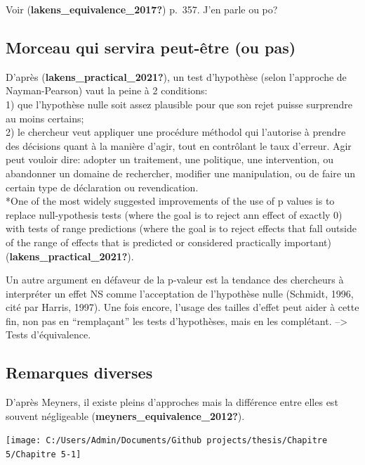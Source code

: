 \documentclass[
  english,
  man]{apa6}
\begin{document}
Voir (\textbf{lakens\_equivalence\_2017?}) p.~357. J'en parle ou po?

\hypertarget{morceau-qui-servira-peut-uxeatre-ou-pas}{%
\subsection{Morceau qui servira peut-être (ou pas)}\label{morceau-qui-servira-peut-uxeatre-ou-pas}}

D'après (\textbf{lakens\_practical\_2021?}), un test d'hypothèse (selon l'approche de Nayman-Pearson) vaut la peine à 2 conditions:\\
1) que l'hypothèse nulle soit assez plausible pour que son rejet puisse surprendre au moins certains;\\
2) le chercheur veut appliquer une procédure méthodol qui l'autorise à prendre des décisions quant à la manière d'agir, tout en contrôlant le taux d'erreur. Agir peut vouloir dire: adopter un traitement, une politique, une intervention, ou abandonner un domaine de rechercher, modifier une manipulation, ou de faire un certain type de déclaration ou revendication.\\
*One of the most widely suggested improvements of the use of p values is to replace null-ypothesis tests (where the goal is to reject ann effect of exactly 0) with tests of range predictions (where the goal is to reject effects that fall outside of the range of effects that is predicted or considered practically important) (\textbf{lakens\_practical\_2021?}).

Un autre argument en défaveur de la p-valeur est la tendance des chercheurs à interpréter un effet NS comme l'acceptation de l'hypothèse nulle (Schmidt, 1996, cité par Harris, 1997). Une fois encore, l'usage des tailles d'effet peut aider à cette fin, non pas en ``remplaçant'' les tests d'hypothèses, mais en les complétant. --\textgreater{} Tests d'équivalence.

\hypertarget{remarques-diverses}{%
\subsection{Remarques diverses}\label{remarques-diverses}}

D'après Meyners, il existe pleins d'approches mais la différence entre elles est souvent négligeable (\textbf{meyners\_equivalence\_2012?}).

\begin{center}\texttt{[image: C:/Users/Admin/Documents/Github projects/thesis/Chapitre 5/Chapitre 5-1]} \end{center}
\end{document}
